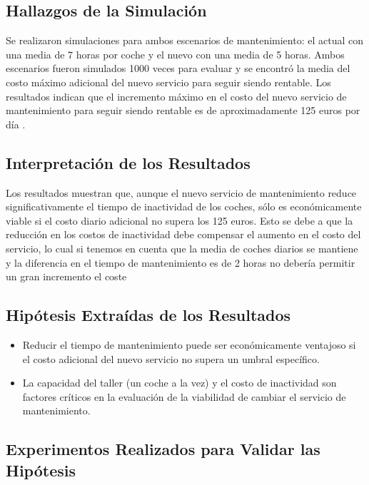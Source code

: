 \subsection{Hallazgos de la Simulación}\label{subsec:hallazgos-de-la-simulacion}

Se realizaron simulaciones para ambos escenarios de mantenimiento: el actual con una media de 7 horas por coche y el nuevo con una media de 5 horas.
Ambos escenarios fueron simulados 1000 veces para evaluar y se encontró la media del costo máximo adicional del nuevo servicio para seguir siendo rentable.
Los resultados indican que el incremento máximo en el costo del nuevo servicio de mantenimiento para seguir siendo rentable es de aproximadamente 125 euros por día .

\subsection{Interpretación de los Resultados}\label{subsec:interpretacion-de-los-resultados}

Los resultados muestran que, aunque el nuevo servicio de mantenimiento reduce significativamente el tiempo de inactividad de los coches, sólo es económicamente viable si el costo diario adicional no supera los 125 euros.
Esto se debe a que la reducción en los costos de inactividad debe compensar el aumento en el costo del servicio, lo cual si tenemos en cuenta que la media de coches diarios se mantiene y la diferencia
en el tiempo de mantenimiento es de 2 horas no debería permitir un gran incremento el coste

\subsection{Hipótesis Extraídas de los Resultados}\label{subsec:hipotesis-extraidas-de-los-resultados}

\begin{itemize}
    \item Reducir el tiempo de mantenimiento puede ser económicamente ventajoso si el costo adicional del nuevo servicio no supera un umbral específico.
    \item La capacidad del taller (un coche a la vez) y el costo de inactividad son factores críticos en la evaluación de la viabilidad de cambiar el servicio de mantenimiento.
\end{itemize}

\subsection{Experimentos Realizados para Validar las Hipótesis}\label{subsec:experimentos-realizados-para-validar-las-hipotesis}

